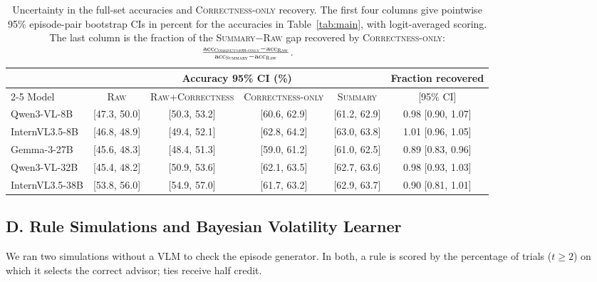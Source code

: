 \documentclass[letterpaper]{article} %
\newcommand{\Raw}{\textsc{Raw}}
\newcommand{\RawCorrectness}{\textsc{Raw+Correctness}}
\newcommand{\CorrectnessOnly}{\textsc{Correctness-only}}
\newcommand{\Summary}{\textsc{Summary}}
\begin{document}
\begin{table}[!t]\centering\small
  \setlength{\tabcolsep}{4pt}
  \begin{tabular}{l cccc c}
    \toprule
     & \multicolumn{4}{c}{Accuracy 95\% CI (\%)} & Fraction recovered \\
    \cmidrule(lr){2-5}
    Model & \Raw{} & \RawCorrectness{} & \CorrectnessOnly{} & \Summary{} & [95\% CI] \\
    \midrule
    Qwen3-VL-8B & [47.3, 50.0] & [50.3, 53.2] & [60.6, 62.9] & [61.2, 62.9] & 0.98 [0.90, 1.07] \\
    InternVL3.5-8B & [46.8, 48.9] & [49.4, 52.1] & [62.8, 64.2] & [63.0, 63.8] & 1.01 [0.96, 1.05] \\
    Gemma-3-27B & [45.6, 48.3] & [48.4, 51.3] & [59.0, 61.2] & [61.0, 62.5] & 0.89 [0.83, 0.96] \\
    Qwen3-VL-32B & [45.4, 48.2] & [50.9, 53.6] & [62.1, 63.5] & [62.7, 63.6] & 0.98 [0.93, 1.03] \\
    InternVL3.5-38B & [53.8, 56.0] & [54.9, 57.0] & [61.7, 63.2] & [62.9, 63.7] & 0.90 [0.81, 1.01] \\
    \bottomrule
  \end{tabular}
  \caption{Uncertainty in the full-set accuracies and \CorrectnessOnly{} recovery. The first four columns give pointwise 95\% episode-pair bootstrap CIs in percent for the accuracies in Table~\ref{tab:main}, with logit-averaged scoring. The last column is the fraction of the \Summary{}$-$\Raw{} gap recovered by \CorrectnessOnly{}: $\frac{\mathrm{acc}_{\text{\CorrectnessOnly{}}}-\mathrm{acc}_{\text{\Raw{}}}}{\mathrm{acc}_{\text{\Summary{}}}-\mathrm{acc}_{\text{\Raw{}}}}$.}
  \label{tab:decomp}
\end{table}
\subsection{D. Rule Simulations and Bayesian Volatility Learner}
We ran two simulations without a VLM to check the episode generator. In both, a rule is scored by the percentage of trials ($t \ge 2$) on which it selects the correct advisor; ties receive half credit.
\end{document}
